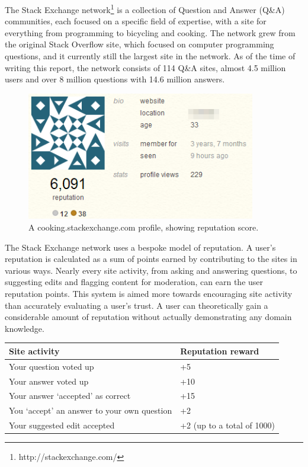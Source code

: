 \documentclass[]{final_report}
\begin{document}
The Stack Exchange network\footnote{http://stackexchange.com/} is a collection of Question and Answer (Q\&A) communities, each focused on a specific field of expertise, with a site for everything from programming to bicycling and cooking. The network grew from the original Stack Overflow site, which focused on computer programming questions, and it currently still the largest site in the network. As of the time of writing this report, the network consists of 114 Q\&A sites, almost 4.5 million users and over 8 million questions with 14.6 million answers.

\begin{figure}[ht!]
\centering
\includegraphics[width=100mm]{serep.png}
\caption{A cooking.stackexchange.com profile, showing reputation score.}
\end{figure}


The Stack Exchange network uses a bespoke model of reputation. A user's reputation is calculated as a sum of points earned by contributing to the sites in various ways. Nearly every site activity, from asking and answering questions, to suggesting edits and flagging content for moderation, can earn the user reputation points. This system is aimed more towards encouraging site activity than accurately evaluating a user's trust. A user can theoretically gain a considerable amount of reputation without actually demonstrating any domain knowledge.

\begin{minipage}{\linewidth}
\centering
\begin{tabular}{|l|l|}
\hline \textbf{Site activity} & \textbf{Reputation reward} \\ 
\hline Your question voted up & +5 \\ 
\hline Your answer voted up & +10 \\ 
\hline Your answer `accepted' as correct & +15 \\ 
\hline You `accept' an answer to your own question & +2 \\ 
\hline Your suggested edit accepted & +2 (up to a total of 1000) \\ 
\hline 
\end{tabular}\par
{} \label{tab:title}
\end{minipage}
\end{document}
